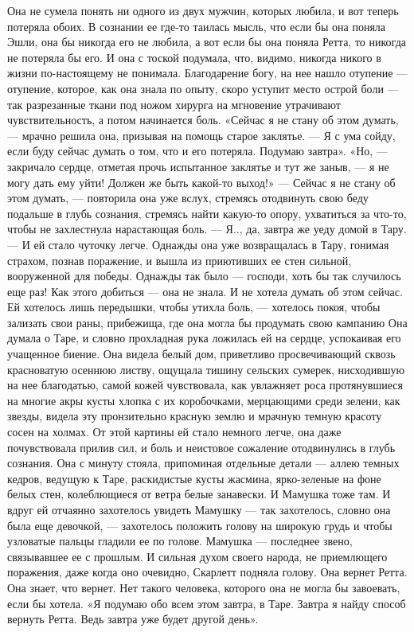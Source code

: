 Она не сумела понять ни одного из двух мужчин, которых любила, и вот теперь потеряла обоих. В сознании ее где-то таилась мысль, что если бы она поняла Эшли, она бы никогда его не любила, а вот если бы она поняла Ретта, то никогда не потеряла бы его. И она с тоской подумала, что, видимо, никогда никого в жизни по-настоящему не понимала.
Благодарение богу, на нее нашло отупение — отупение, которое, как она знала по опыту, скоро уступит место острой боли — так разрезанные ткани под ножом хирурга на мгновение утрачивают чувствительность, а потом начинается боль.
«Сейчас я не стану об этом думать, — мрачно решила она, призывая на помощь старое заклятье. — Я с ума сойду, если буду сейчас думать о том, что и его потеряла. Подумаю завтра».
«Но, — закричало сердце, отметая прочь испытанное заклятье и тут же заныв, — я не могу дать ему уйти! Должен же быть какой-то выход!» — Сейчас я не стану об этом думать, — повторила она уже вслух, стремясь отодвинуть свою беду подальше в глубь сознания, стремясь найти какую-то опору, ухватиться за что-то, чтобы не захлестнула нарастающая боль. — Я.., да, завтра же уеду домой в Тару. — И ей стало чуточку легче.
Однажды она уже возвращалась в Тару, гонимая страхом, познав поражение, и вышла из приютивших ее стен сильной, вооруженной для победы. Однажды так было — господи, хоть бы так случилось еще раз! Как этого добиться — она не знала. И не хотела думать об этом сейчас. Ей хотелось лишь передышки, чтобы утихла боль, — хотелось покоя, чтобы зализать свои раны, прибежища, где она могла бы продумать свою кампанию Она думала о Таре, и словно прохладная рука ложилась ей на сердце, успокаивая его учащенное биение. Она видела белый дом, приветливо просвечивающий сквозь красноватую осеннюю листву, ощущала тишину сельских сумерек, нисходившую на нее благодатью, самой кожей чувствовала, как увлажняет роса протянувшиеся на многие акры кусты хлопка с их коробочками, мерцающими среди зелени, как звезды, видела эту пронзительно красную землю и мрачную темную красоту сосен на холмах.
От этой картины ей стало немного легче, она даже почувствовала прилив сил, и боль и неистовое сожаление отодвинулись в глубь сознания. Она с минуту стояла, припоминая отдельные детали — аллею темных кедров, ведущую к Таре, раскидистые кусты жасмина, ярко-зеленые на фоне белых стен, колеблющиеся от ветра белые занавески. И Мамушка тоже там. И вдруг ей отчаянно захотелось увидеть Мамушку — так захотелось, словно она была еще девочкой, — захотелось положить голову на широкую грудь и чтобы узловатые пальцы гладили ее по голове. Мамушка — последнее звено, связывавшее ее с прошлым.
И сильная духом своего народа, не приемлющего поражения, даже когда оно очевидно, Скарлетт подняла голову. Она вернет Ретта. Она знает, что вернет. Нет такого человека, которого она не могла бы завоевать, если бы хотела.
«Я подумаю обо всем этом завтра, в Таре. Завтра я найду способ вернуть Ретта. Ведь завтра уже будет другой день».

